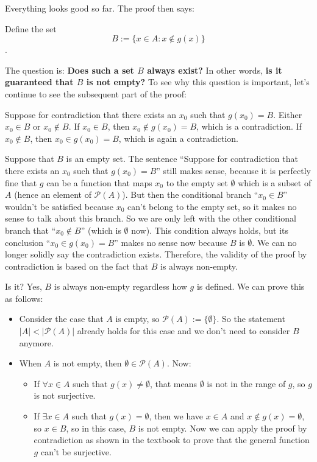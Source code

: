 \documentclass[12pt, letterpaper, oneside]{book}
\begin{document}
Everything looks good so far. The proof then says:

\begin{displayquote}
  Define the set \[B:= \{x \in A: x \notin g(x)\}\].
\end{displayquote}

The question is: \textbf{Does such a set $B$ always exist?} In other words,
\textbf{is it guaranteed that $B$ is not empty?} To see why this question is
important, let's continue to see the subsequent part of the proof:

\begin{displayquote}
  Suppose for contradiction that there exists an $x_0$ such that $g(x_0) = B$.
  Either $x_0 \in B$ or $x_0 \notin B$. If $x_0 \in B$, then $x_0 \notin g(x_0)
  = B$, which is a contradiction. If $x_0 \notin B$, then $x_0 \in g(x_0) = B$,
  which is again a contradiction.
\end{displayquote}

Suppose that $B$ is an empty set. The sentence ``Suppose for contradiction that
there exists an $x_0$ such that $g(x_0) = B$'' still makes sense, because it is
perfectly fine that $g$ can be a function that maps $x_0$ to the empty set
$\emptyset$ which is a subset of $A$ (hence an element of $\mathcal{P}(A)$).
But then the conditional branch ``$x_0 \in B$'' wouldn't be satisfied because
$x_0$ can't belong to the empty set, so it makes no sense to talk about this
branch. So we are only left with the other conditional branch that ``$x_0 \notin
B$'' (which is $\emptyset$ now). This condition always holds, but its conclusion
``$x_0 \in g(x_0) = B$'' makes no sense now because $B$ is $\emptyset$. We can
no longer solidly say the contradiction exists. Therefore, the validity of the
proof by contradiction is based on the fact that $B$ is always non-empty.

Is it? Yes, $B$ is always non-empty regardless how $g$ is defined. We can prove
this as follows:

\begin{itemize}
  \item Consider the case that $A$ is empty, so $\mathcal{P}(A):=
    \{\emptyset\}$. So the statement $|A| < |\mathcal{P}(A)|$ already holds for
    this case and we don't need to consider $B$ anymore.
  \item When $A$ is not empty, then $\emptyset \in \mathcal{P}(A)$. Now:
  \begin{itemize}
    \item If $\forall x \in A$ such that $g(x) \neq \emptyset$, that means
      $\emptyset$ is not in the range of $g$, so $g$ is not surjective.
    \item If $\exists x \in A$ such that $g(x) = \emptyset$, then we have
      $x \in A$ and $x \notin g(x) = \emptyset$, so $x \in B$, so in this case,
      $B$ is not empty. Now we can apply the proof by contradiction as shown in
      the textbook to prove that the general function $g$ can't be surjective.
  \end{itemize}
\end{itemize}
\end{document}

